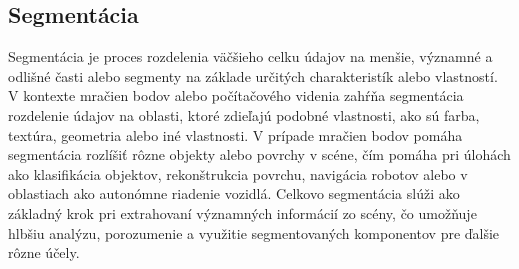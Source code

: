\subsection{Segmentácia}
\noindent Segmentácia je proces rozdelenia väčšieho celku údajov na menšie, významné a odlišné časti alebo segmenty na základe určitých charakteristík alebo vlastností. V kontexte mračien bodov alebo počítačového videnia zahŕňa segmentácia rozdelenie údajov na oblasti, ktoré zdieľajú podobné vlastnosti, ako sú farba, textúra, geometria alebo iné vlastnosti. V prípade mračien bodov pomáha segmentácia rozlíšiť rôzne objekty alebo povrchy v scéne, čím pomáha pri úlohách ako klasifikácia objektov, rekonštrukcia povrchu, navigácia robotov alebo v oblastiach ako autonómne riadenie vozidlá. Celkovo segmentácia slúži ako základný krok pri extrahovaní významných informácií zo scény, čo umožňuje hlbšiu analýzu, porozumenie a využitie segmentovaných komponentov pre ďalšie rôzne účely. 
